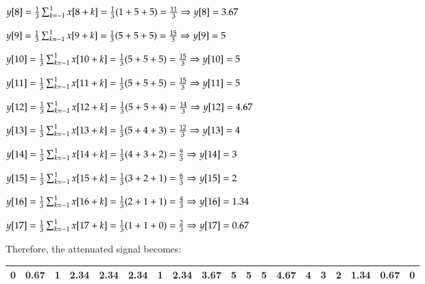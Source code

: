 \documentclass[a4paper,11pt]{article}
\begin{document}
${ y[8] = \frac{1}{3} \large\sum _{k=-1}^{1} x[8+k] = \frac{1}{3} (1+5+5) = \frac{11}{3} \Rightarrow y[8]=  3.67 }$ \newline

${ y[9] = \frac{1}{3} \large\sum _{k=-1}^{1} x[9+k] = \frac{1}{3} (5+5+5) = \frac{15}{3} \Rightarrow y[9]=  5 }$ \newline

${ y[10] = \frac{1}{3} \large\sum _{k=-1}^{1} x[10+k] = \frac{1}{3} (5+5+5) = \frac{15}{3} \Rightarrow y[10]=  5 }$ \newline

${ y[11] = \frac{1}{3} \large\sum _{k=-1}^{1} x[11+k] = \frac{1}{3} (5+5+5) = \frac{15}{3} \Rightarrow y[11]=  5 }$ \newline

${ y[12] = \frac{1}{3} \large\sum _{k=-1}^{1} x[12+k] = \frac{1}{3} (5+5+4) = \frac{14}{3} \Rightarrow y[12]=  4.67 }$ \newline

${ y[13] = \frac{1}{3} \large\sum _{k=-1}^{1} x[13+k] = \frac{1}{3} (5+4+3) = \frac{12}{3} \Rightarrow y[13]=  4 }$ \newline

${ y[14] = \frac{1}{3} \large\sum _{k=-1}^{1} x[14+k] = \frac{1}{3} (4+3+2) = \frac{9}{3} \Rightarrow y[14]=  3 }$ \newline

${ y[15] = \frac{1}{3} \large\sum _{k=-1}^{1} x[15+k] = \frac{1}{3} (3+2+1) = \frac{6}{3} \Rightarrow y[15]=  2 }$ \newline

${ y[16] = \frac{1}{3} \large\sum _{k=-1}^{1} x[16+k] = \frac{1}{3} (2+1+1) = \frac{4}{3} \Rightarrow y[16]=  1.34 }$ \newline

${ y[17] = \frac{1}{3} \large\sum _{k=-1}^{1} x[17+k] = \frac{1}{3} (1+1+0) = \frac{2}{3} \Rightarrow y[17]=  0.67 }$ \newline

Therefore, the attenuated signal becomes: \newline
\begin{center}
\begin{tabular}{|c|c|c|c|c|c|c|c|c|c|c|c|c|c|c|c|c|c|c|}
\hline
 0 \cellcolor{lightgray}&0.67&1&	2.34&	2.34&	2.34&	1&	2.34&	3.67&	5&	5&	5&	4.67&	4&	3&	2&	1.34&	0.67&	0 \cellcolor{lightgray}\\
 \hline
\end{tabular}
\end{center}
\end{document}
